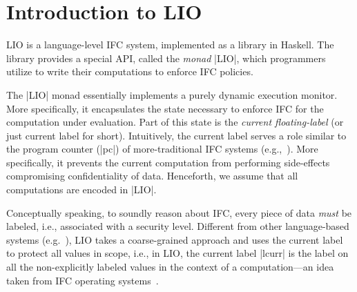 \section{Introduction to LIO}
\label{sec:background}

LIO is a language-level IFC system, implemented as a library in Haskell.  The
library provides a special API, called the \emph{monad} |LIO|, which 
programmers utilize to write their computations to enforce IFC policies. 
%
%
%

The |LIO| monad essentially implements a purely dynamic execution monitor. More 
specifically, it encapsulates the state necessary to enforce IFC for the computation
under evaluation.
%
Part of this state is the \emph{current floating-label} (or just current label for short).
%
Intuitively, the current label serves a role similar to the program
counter (|pc|) of more-traditional IFC systems
(e.g.,~\cite{FlowCaml}).
%
More specifically, it prevents the current computation from performing 
side-effects compromising confidentiality of data.
Henceforth, we assume that all computations are encoded in |LIO|.

%
%

Conceptually speaking, to soundly reason about IFC, every piece of data 
 \emph{must} be labeled, i.e., associated with a security level.
%
%
%
%
 Different from other language-based systems (e.g.~\cite{myers:jif,FlowCaml}),
 LIO takes a coarse-grained approach and uses the current label to protect all
 values in scope, i.e., in LIO, the current label |lcurr| is the label on all
 the non-explicitly labeled values in the context of a computation---an idea taken
 from IFC operating systems~\cite{efstathopoulos:asbestos,zeldovich:histar}.
%
%

